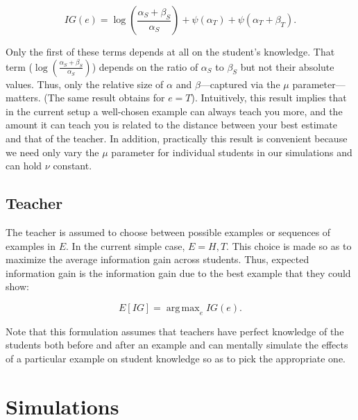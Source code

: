 \documentclass[10pt,letterpaper]{article}
\DeclareMathOperator*{\argmax}{arg\,max}
\begin{document}
\begin{equation}
IG(e) = \log(\frac{\alpha_S + \beta_S}{\alpha_S}) + \psi (\alpha_T) + \psi (\alpha_T + \beta_T).
\end{equation}

\noindent Only the first of these terms depends at all on the student's knowledge. That term ($\log(\frac{\alpha_S + \beta_S}{\alpha_S})$) depends on the ratio of $\alpha_S$ to $\beta_S$ but not their absolute values. Thus, only the relative size of $\alpha$ and $\beta$---captured via the $\mu$ parameter---matters. (The same result obtains for $e=T$). Intuitively, this result implies that in the current setup a well-chosen example can always teach you more, and the amount it can teach you is related to the distance between your best estimate and that of the teacher. In addition, practically this result is convenient because we need only vary the $\mu$ parameter for individual students in our simulations and can hold $\nu$ constant.


\subsection{Teacher}

The teacher is assumed to choose between possible examples or sequences of examples in $E$. In the current simple case, $E={H,T}$. This choice is made so as to maximize the average information gain across students. Thus, expected information gain is the information gain due to the best example that they could show:

\begin{equation}
E[IG] = \argmax_e {IG(e)}.
\end{equation}

\noindent Note that this formulation assumes that teachers have perfect knowledge of the students both before and after an example and can mentally simulate the effects of a particular example on student knowledge so as to pick the appropriate one. 

 \section{Simulations}
\end{document}
